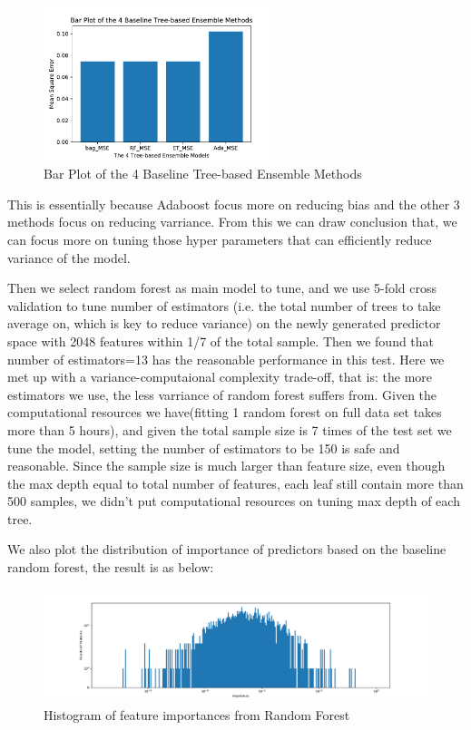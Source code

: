 \documentclass[11pt]{article}
\begin{document}
\begin{enumerate}
\begin{enumerate}
\begin{figure}[h]
\centering
\includegraphics[width=0.6\textwidth]{MSE_ensemble}
\caption{Bar Plot of the 4 Baseline Tree-based Ensemble Methods}
\label{fig:MSE_ensemble}
\end{figure}


This is essentially because Adaboost focus more on reducing bias and the other 3 methods focus on reducing varriance. From this we can draw conclusion that, we can focus more on tuning those hyper parameters that can efficiently reduce variance of the model. 

Then we select random forest as main model to tune, and we use 5-fold cross validation to tune number of estimators (i.e. the total number of trees to take average on, which is key to reduce variance) on the newly generated predictor space with 2048 features within 1/7 of the total sample. Then we found that number of estimators=13 has the reasonable performance in this test. Here we met up with a variance-computaional complexity trade-off, that is: the more estimators we use, the less varriance of random forest suffers from. Given the computational resources we have(fitting 1 random forest on full data set takes more than 5 hours), and given the total sample size is 7 times of the test set we tune the model, setting the number of estimators to be 150 is safe and reasonable. Since the sample size is much larger than feature size, even though the max depth equal to total number of features, each leaf still contain more than 500 samples, we didn't put computational resources on tuning max depth of each tree.

We also plot the distribution of importance of predictors based on the baseline random forest, the result is as below:

\begin{figure}[h]
\centering
\includegraphics[width=\textwidth]{his_feature_importance_log}
\caption{Histogram of feature importances from Random Forest}
\label{fig:his_feature_importance_log}
\end{figure}


\end{enumerate}
\end{enumerate}
\end{document}
